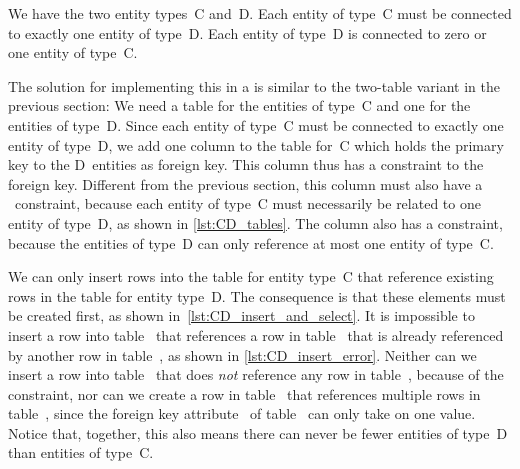 %
\label{sec:rm:cd}%
%
%
%
%
%
%
%
We have the two entity types~C and~D.
Each entity of type~C must be connected to exactly one entity of type~D.
Each entity of type~D is connected to zero or one entity of type~C.

The solution for implementing this in a  is similar to the two-table variant in the previous section:
We need a table for the entities of type~C and one for the entities of type~D.
Since each entity of type~C must be connected to exactly one entity of type~D, we add one column to the table for~C which holds the primary key to the D~entities as foreign key.
This column thus has a  constraint to the foreign key.
Different from the previous section, this column must also have a ~constraint, because each entity of type~C must necessarily be related to one entity of type~D, as shown in \cref{lst:CD_tables}.
The column also has a  constraint, because the entities of type~D can only reference at most one entity of type~C.

We can only insert rows into the table for entity type~C that reference existing rows in the table for entity type~D.
The consequence is that these elements must be created first, as shown in~\cref{lst:CD_insert_and_select}.
It is impossible to insert a row into table~ that references a row in table~ that is already referenced by another row in table~, as shown in \cref{lst:CD_insert_error}.
Neither can we insert a row into table~ that does \emph{not} reference any row in table~, because of the  constraint, nor can we create a row in table~ that references multiple rows in table~, since the foreign key attribute~ of table~ can only take on one value.
Notice that, together, this also means there can never be fewer entities of type~D than entities of type~C.%
%
\FloatBarrier%
\endhsection%
%
